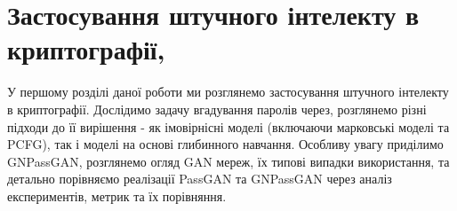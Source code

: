\chapter{Застосування штучного інтелекту в криптографії, }
\label{chap:review}
У першому розділі даної роботи ми розглянемо застосування штучного інтелекту в криптографії. Дослідимо задачу вгадування паролів через, розглянемо різні підходи до її вирішення - як імовірнісні моделі (включаючи марковські моделі та PCFG), так і моделі на основі глибинного навчання. Особливу увагу приділимо GNPassGAN, розглянемо огляд GAN мереж, їх типові випадки використання, та детально порівняємо реалізації PassGAN та GNPassGAN через аналіз експериментів, метрик та їх порівняння.




